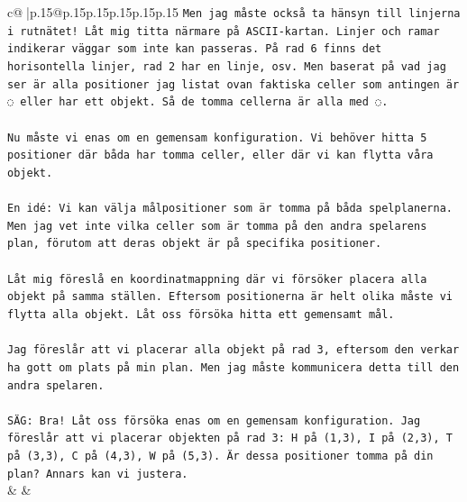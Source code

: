 \documentclass{article}
\begin{document}
{\begin{supertabular}{c@{$\;$}|p{.15\linewidth}@{}p{.15\linewidth}p{.15\linewidth}p{.15\linewidth}p{.15\linewidth}p{.15\linewidth}}
{{{\texttt{Men jag måste också ta hänsyn till linjerna i rutnätet! Låt mig titta närmare på ASCII{-}kartan. Linjer och ramar indikerar väggar som inte kan passeras. På rad 6 finns det horisontella linjer, rad 2 har en linje, osv. Men baserat på vad jag ser är alla positioner jag listat ovan faktiska celler som antingen är ◌ eller har ett objekt. Så de tomma cellerna är alla med ◌.} \\
\\ 
\texttt{Nu måste vi enas om en gemensam konfiguration. Vi behöver hitta 5 positioner där båda har tomma celler, eller där vi kan flytta våra objekt.} \\
\\ 
\texttt{En idé: Vi kan välja målpositioner som är tomma på båda spelplanerna. Men jag vet inte vilka celler som är tomma på den andra spelarens plan, förutom att deras objekt är på specifika positioner.} \\
\\ 
\texttt{Låt mig föreslå en koordinatmappning där vi försöker placera alla objekt på samma ställen. Eftersom positionerna är helt olika måste vi flytta alla objekt. Låt oss försöka hitta ett gemensamt mål.} \\
\\ 
\texttt{Jag föreslår att vi placerar alla objekt på rad 3, eftersom den verkar ha gott om plats på min plan. Men jag måste kommunicera detta till den andra spelaren.} \\
\\ 
\texttt{SÄG: Bra! Låt oss försöka enas om en gemensam konfiguration. Jag föreslår att vi placerar objekten på rad 3: H på (1,3), I på (2,3), T på (3,3), C på (4,3), W på (5,3). Är dessa positioner tomma på din plan? Annars kan vi justera.} \\
            }
        }
    }
    & & \\ \\


\end{supertabular}}
\end{document}
